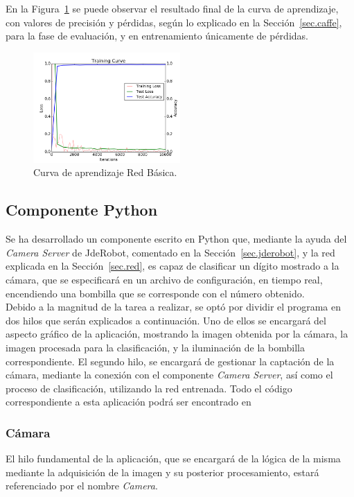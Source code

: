 	En la Figura~\ref{fig.Log} se puede observar el resultado final de la curva de aprendizaje, con valores de precisión y pérdidas, según lo explicado en la Sección~\ref{sec.caffe}, para la fase de evaluación, y en entrenamiento únicamente de pérdidas.
	
	\begin{figure}[H]
		\begin{center}
			\includegraphics[width=0.5\textwidth]{figures/RedBasicaLog}
			\caption{Curva de aprendizaje Red Básica.}
			\label{fig.Log}
		\end{center}
	\end{figure}

\subsection{Componente Python}
Se ha desarrollado un componente escrito en Python que, mediante la ayuda del \textit{Camera Server} de JdeRobot, comentado en la Sección~\ref{sec.jderobot},  y la red explicada en la Sección~\ref{sec.red}, es capaz de clasificar un dígito mostrado a la cámara, que se especificará en un archivo de configuración, en tiempo real, encendiendo una bombilla que se corresponde con el número obtenido.\\

Debido a la magnitud de la tarea a realizar, se optó por dividir el programa en dos hilos que serán explicados a continuación. Uno de ellos se encargará del aspecto gráfico de la aplicación, mostrando la imagen obtenida por la cámara, la imagen procesada para la clasificación, y la iluminación de la bombilla correspondiente. El segundo hilo, se encargará de gestionar la captación de la cámara, mediante la conexión con el componente \textit{Camera Server}, así como el proceso de clasificación, utilizando la red entrenada. Todo el código correspondiente a esta aplicación podrá ser encontrado en 
\subsubsection{Cámara} \label{sec.camara}
El hilo fundamental de la aplicación, que se encargará de la lógica de la misma mediante la adquisición de la imagen y su posterior procesamiento, estará referenciado por el nombre \textit{Camera}.\\

